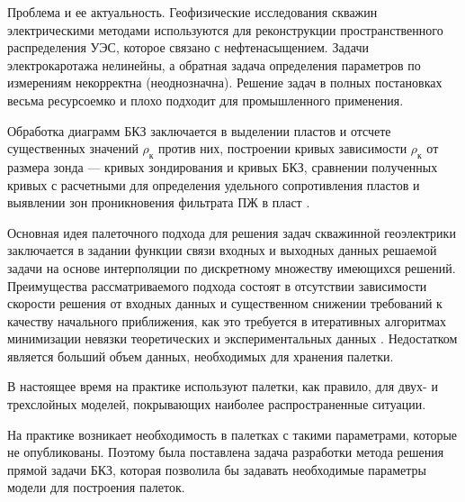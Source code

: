
Проблема и ее актуальность. Геофизические исследования скважин
электрическими методами используются для
реконструкции пространственного распределения
УЭС, которое связано с нефтенасыщением.
Задачи электрокаротажа нелинейны, а обратная
задача определения параметров по измерениям
некорректна (неоднозначна). Решение задач в
полных постановках весьма ресурсоемко и плохо
подходит для промышленного применения.

Обработка диаграмм БКЗ заключается в выделении пластов
и отсчете существенных значений $\rho_\text {к}$ против них, построении
кривых зависимости $\rho_\text {к}$ от размера зонда --- кривых зондирования
и кривых БКЗ, сравнении полученных кривых с расчетными
для определения удельного сопротивления пластов и выявлении
зон проникновения фильтрата ПЖ в пласт \cite{valiullin}.

Основная идея палеточного подхода для решения задач скважинной
геоэлектрики заключается в задании функции связи входных
и выходных данных решаемой задачи на основе интерполяции по
дискретному множеству имеющихся решений.
Преимущества рассматриваемого
подхода состоят в отсутствии зависимости скорости
решения от входных данных и существенном снижении требований к
качеству начального приближения, как это требуется в итеративных алгоритмах
минимизации невязки теоретических и экспериментальных данных \cite{palette}.
Недостатком является больший объем данных, необходимых для хранения палетки.

В настоящее
время на практике используют палетки, как правило, для
двух- и трехслойных моделей, покрывающих наиболее
распространенные ситуации.

На практике возникает необходимость в палетках с такими параметрами, которые не опубликованы. Поэтому была поставлена задача разработки метода решения прямой задачи БКЗ, которая позволила бы задавать необходимые параметры модели для построения палеток.

\clearpage